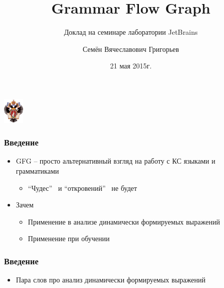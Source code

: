 \documentclass{beamer}
\title[GFG]{Grammar Flow Graph}
\subtitle[семнинар]{Доклад на семинаре лаборатории JetBrains}
\institute[СПбГУ]{
Санкт-Петербургский государственный университет \\
Математико-Механический факультет }
\author[С.В. Григорьев]{Семён Вячеславович Григорьев}
\date{21 мая 2015г.}
\begin{document}
{

\begin{frame}
\begin{center}
{\includegraphics[width=1cm]{SPbGU_Logo.png}}
\end{center}
\titlepage
\end{frame}
}

\begin{frame}
    \transwipe[direction=90]
    \frametitle{Введение}
    \begin{itemize}
        \item GFG -- просто альтернативный взгляд на работу с КС языками и грамматиками
        \begin{itemize}
            \item ``Чудес'' \ и ``откровений'' \ не будет       
        \end{itemize}
        \item Зачем
        \begin{itemize}
            \item Применение в анализе динамически формируемых выражений
            \item Применение при обучении
        \end{itemize}
    \end{itemize}

\end{frame}

\begin{frame}
    \transwipe[direction=90]
    \frametitle{Введение}
    \begin{itemize}
        \item Пара слов про анализ динамически формируемых выражений
    \end{itemize}
\end{frame}
\end{document}
